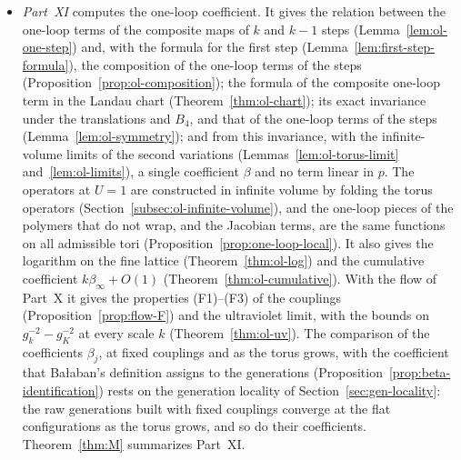 \begin{itemize}
\begin{itemize}
  \end{itemize}
  Theorems~\ref{thm:K} and~\ref{thm:L} summarize the step, and Theorem~\ref{thm:N} the flow.
\item \emph{Part~XI} computes the one-loop coefficient. It gives the relation between the one-loop terms of the composite maps of $k$ and $k-1$ steps (Lemma~\ref{lem:ol-one-step}) and, with the formula for the first step (Lemma~\ref{lem:first-step-formula}), the composition of the one-loop terms of the steps (Proposition~\ref{prop:ol-composition}); the formula of the composite one-loop term in the Landau chart (Theorem~\ref{thm:ol-chart}); its exact invariance under the translations and $B_4$, and that of the one-loop terms of the steps (Lemma~\ref{lem:ol-symmetry}); and from this invariance, with the infinite-volume limits of the second variations (Lemmas~\ref{lem:ol-torus-limit} and~\ref{lem:ol-limits}), a single coefficient $\beta$ and no term linear in $p$. The operators at $U=1$ are constructed in infinite volume by folding the torus operators (Section~\ref{subsec:ol-infinite-volume}), and the one-loop pieces of the polymers that do not wrap, and the Jacobian terms, are the same functions on all admissible tori (Proposition~\ref{prop:one-loop-local}). It also gives the logarithm on the fine lattice (Theorem~\ref{thm:ol-log}) and the cumulative coefficient $k\beta_\infty+O(1)$ (Theorem~\ref{thm:ol-cumulative}). With the flow of Part~X it gives the properties (F1)--(F3) of the couplings (Proposition~\ref{prop:flow-F}) and the ultraviolet limit, with the bounds on $g_k^{-2}-g_K^{-2}$ at every scale $k$ (Theorem~\ref{thm:ol-uv}). The comparison of the coefficients $\beta_j$, at fixed couplings and as the torus grows, with the coefficient that Ba\l aban's definition \cite[(1.20)--(1.22)]{BalYM4I} assigns to the generations (Proposition~\ref{prop:beta-identification}) rests on the generation locality of Section~\ref{sec:gen-locality}: the raw generations built with fixed couplings converge at the flat configurations as the torus grows, and so do their coefficients. Theorem~\ref{thm:M} summarizes Part~XI.
\end{itemize}


